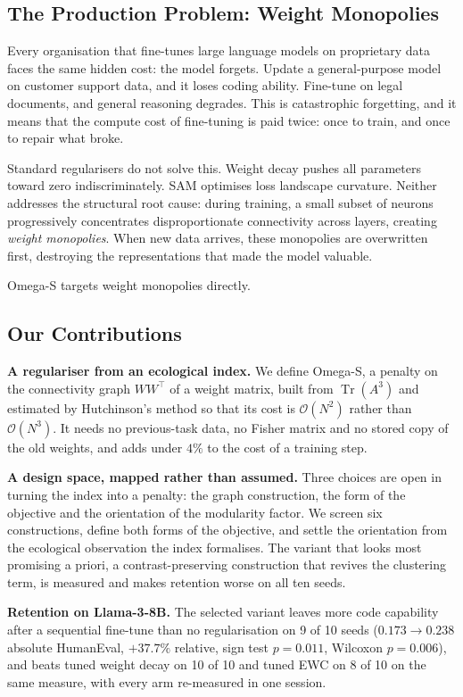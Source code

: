 \documentclass[11pt,a4paper]{article}
\begin{document}
\subsection{The Production Problem: Weight Monopolies}

Every organisation that fine-tunes large language models on proprietary
data faces the same hidden cost: the model forgets. Update a general-purpose
model on customer support data, and it loses coding ability. Fine-tune on
legal documents, and general reasoning degrades. This is catastrophic
forgetting, and it means that the compute cost of fine-tuning is paid
twice: once to train, and once to repair what broke.

Standard regularisers do not solve this. Weight decay pushes all parameters
toward zero indiscriminately. SAM optimises loss landscape curvature.
Neither addresses the structural root cause: during training, a small subset
of neurons progressively concentrates disproportionate connectivity across
layers, creating \emph{weight monopolies}. When new data arrives, these
monopolies are overwritten first, destroying the representations that
made the model valuable.

Omega-S targets weight monopolies directly.

\subsection{Our Contributions}

\textbf{A regulariser from an ecological index.} We define Omega-S, a penalty
on the connectivity graph $WW^\top$ of a weight matrix, built from
$\operatorname{Tr}(A^3)$ and estimated by Hutchinson's method so that its cost
is $\mathcal{O}(N^2)$ rather than $\mathcal{O}(N^3)$. It needs no previous-task
data, no Fisher matrix and no stored copy of the old weights, and adds under
$4\%$ to the cost of a training step.

\textbf{A design space, mapped rather than assumed.} Three choices are open in
turning the index into a penalty: the graph construction, the form of the
objective and the orientation of the modularity factor. We screen six
constructions, define both forms of the objective, and settle the orientation
from the ecological observation the index formalises. The variant that looks
most promising a priori, a contrast-preserving construction that revives the
clustering term, is measured and makes retention worse on all ten seeds.

\textbf{Retention on Llama-3-8B.} The selected variant leaves more code
capability after a sequential fine-tune than no regularisation on 9 of 10 seeds
($0.173 \to 0.238$ absolute HumanEval, $+37.7\%$ relative, sign test $p=0.011$,
Wilcoxon $p=0.006$), and beats tuned weight decay on 10 of 10 and tuned EWC on 8
of 10 on the same measure, with every arm re-measured in one session.
\end{document}

